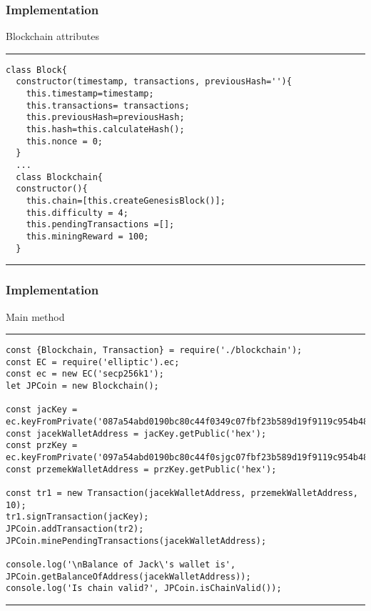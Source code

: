 \documentclass[14pt, aspectratio=169]{beamer}
\begin{document}
\begin{frame}[fragile]
\frametitle{Implementation}
Blockchain attributes
\scriptsize
\rule{\textwidth}{1pt}
\begin{verbatim}
class Block{
  constructor(timestamp, transactions, previousHash=''){
    this.timestamp=timestamp;
    this.transactions= transactions;
    this.previousHash=previousHash;
    this.hash=this.calculateHash();
    this.nonce = 0;
  }
  ...
  class Blockchain{
  constructor(){
    this.chain=[this.createGenesisBlock()];
    this.difficulty = 4;
    this.pendingTransactions =[];
    this.miningReward = 100;
  }
\end{verbatim}
\rule{\textwidth}{1pt}
\end{frame}

\begin{frame}[fragile]
\frametitle{Implementation}
Main method
\scriptsize
\rule{\textwidth}{1pt}
\begin{verbatim}
const {Blockchain, Transaction} = require('./blockchain');
const EC = require('elliptic').ec;
const ec = new EC('secp256k1');
let JPCoin = new Blockchain();

const jacKey = ec.keyFromPrivate('087a54abd0190bc80c44f0349c07fbf23b589d19f9119c954b48d2ab3c2ca92d');
const jacekWalletAddress = jacKey.getPublic('hex');
const przKey = ec.keyFromPrivate('097a54abd0190bc80c44f0sjgc07fbf23b589d19f9119c954b48d2ab3c2ca92d');
const przemekWalletAddress = przKey.getPublic('hex');

const tr1 = new Transaction(jacekWalletAddress, przemekWalletAddress, 10);
tr1.signTransaction(jacKey);
JPCoin.addTransaction(tr2);
JPCoin.minePendingTransactions(jacekWalletAddress);

console.log('\nBalance of Jack\'s wallet is', JPCoin.getBalanceOfAddress(jacekWalletAddress));
console.log('Is chain valid?', JPCoin.isChainValid());

\end{verbatim}
\rule{\textwidth}{1pt}
\end{frame}
\end{document}
